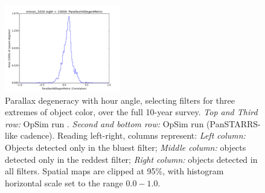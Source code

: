 \begin{figure}[ht]
\begin{center}
  \includegraphics[width=2.0in]{./figs/milkyway/astromPanels/MW_Astrom_paDegen_PanSTARRS_10y_hst.png}
  \end{center}
  \caption{Parallax degeneracy with hour angle, selecting filters for three extremes of object color, over the full 10-year survey. {\it Top and Third row:} OpSim run . {\it Second and bottom row:} OpSim run  (PanSTARRS-like cadence). Reading left-right, columns represent: {\it Left column:} Objects detected only in the bluest filter; {\it Middle column:} objects detected only in the reddest filter; {\it Right column:} objects detected in all filters. Spatial maps are clipped at 95\%, with histogram horizontal scale set to the range $0.0-1.0$.}
  \label{fig_astrom_ByFilter_PADegen}
\end{figure}

